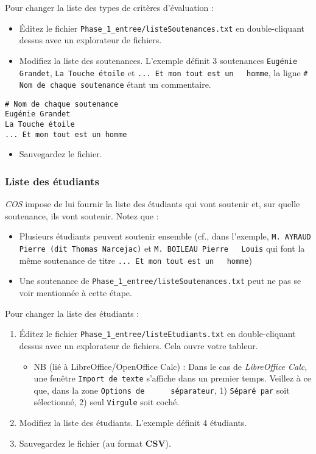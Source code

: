 \documentclass[11pt]{article}
\begin{document}
Pour changer la liste des types de critères d'évaluation :
\begin{itemize}
\item Éditez le fichier \verb~Phase_1_entree/listeSoutenances.txt~ en
double-cliquant dessus avec un explorateur de fichiers.
\item Modifiez la liste des soutenances. L'exemple définit 3 soutenances
\verb~Eugénie Grandet~, \verb~La Touche étoile~ et \verb~... Et mon tout est un   homme~, la ligne \verb~# Nom de chaque soutenance~ étant un commentaire.
\end{itemize}
\begin{verbatim}
# Nom de chaque soutenance
Eugénie Grandet
La Touche étoile
... Et mon tout est un homme
\end{verbatim}
\begin{itemize}
\item Sauvegardez le fichier.
\end{itemize}
\subsubsection{Liste des étudiants}
\label{sec-4-1-5}
\emph{COS} impose de lui fournir la liste des étudiants qui vont soutenir
et, sur quelle soutenance, ils vont soutenir. Notez que :
\begin{itemize}
\item Plusieurs étudiants peuvent soutenir ensemble (cf., dans l'exemple,
\verb~M. AYRAUD Pierre (dit Thomas Narcejac)~ et \verb~M. BOILEAU Pierre   Louis~ qui font la même soutenance de titre \verb~... Et mon tout est un   homme~)
\item Une soutenance de \verb~Phase_1_entree/listeSoutenances.txt~ peut ne pas
se voir mentionnée à cette étape.
\end{itemize}

Pour changer la liste des étudiants :
\begin{enumerate}
\item Éditez le fichier \verb~Phase_1_entree/listeEtudiants.txt~ en
double-cliquant dessus avec un explorateur de fichiers. Cela ouvre
votre tableur.
\begin{itemize}
\item NB (lié à LibreOffice/OpenOffice Calc) : Dans le cas de
\emph{LibreOffice Calc}, une fenêtre \verb~Import de texte~ s'affiche dans
un premier temps. Veillez à ce que, dans la zone \verb~Options de      séparateur~, 1) \verb~Séparé par~ soit sélectionné, 2) seul \verb~Virgule~
soit coché.
\end{itemize}
\item Modifiez la liste des étudiants. L'exemple définit 4 étudiants.
\item Sauvegardez le fichier (au format \textbf{CSV}).
\end{enumerate}
\end{document}
